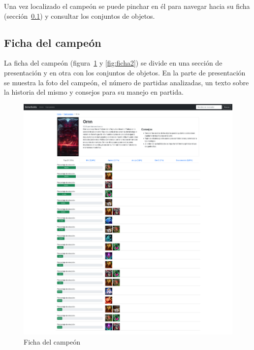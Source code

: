 Una vez localizado el campeón se puede pinchar en él para navegar hacia su ficha (sección~\ref{sec:ficha}) y consultar los conjuntos de objetos.

\subsection{Ficha del campeón}\label{sec:ficha}
La ficha del campeón (figura~\ref{fig:ficha} y \ref{fig:ficha2}) se divide en una sección de presentación y en otra con los conjuntos de objetos. En la parte de presentación se muestra la foto del campeón, el número de partidas analizadas, un texto sobre la historia del mismo y consejos para su manejo en partida.

\begin{figure}[h]
	\centering
	\includegraphics[width=1\linewidth]{img/3.campeon}
	\caption{Ficha del campeón}
	\label{fig:ficha}
\end{figure}
